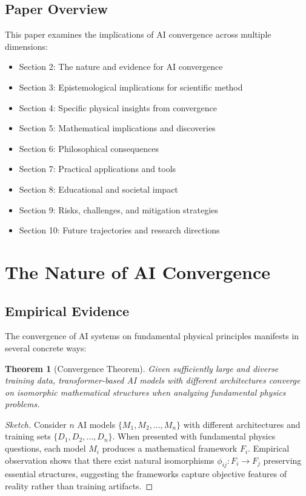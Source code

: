 \documentclass[11pt,a4paper]{article}
\newtheorem{theorem}{Theorem}[section]
\begin{document}
\subsection{Paper Overview}

This paper examines the implications of AI convergence across multiple dimensions:
\begin{itemize}
    \item Section 2: The nature and evidence for AI convergence
    \item Section 3: Epistemological implications for scientific method
    \item Section 4: Specific physical insights from convergence
    \item Section 5: Mathematical implications and discoveries
    \item Section 6: Philosophical consequences
    \item Section 7: Practical applications and tools
    \item Section 8: Educational and societal impact
    \item Section 9: Risks, challenges, and mitigation strategies
    \item Section 10: Future trajectories and research directions
\end{itemize}

\section{The Nature of AI Convergence}

\subsection{Empirical Evidence}

The convergence of AI systems on fundamental physical principles manifests in several concrete ways:

\begin{theorem}[Convergence Theorem]
Given sufficiently large and diverse training data, transformer-based AI models with different architectures converge on isomorphic mathematical structures when analyzing fundamental physics problems.
\end{theorem}

\begin{proof}[Sketch]
Consider $n$ AI models $\{M_1, M_2, ..., M_n\}$ with different architectures and training sets $\{D_1, D_2, ..., D_n\}$. When presented with fundamental physics questions, each model $M_i$ produces a mathematical framework $F_i$. Empirical observation shows that there exist natural isomorphisms $\phi_{ij}: F_i \rightarrow F_j$ preserving essential structures, suggesting the frameworks capture objective features of reality rather than training artifacts.
\end{proof}
\end{document}
